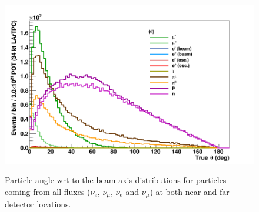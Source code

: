 \begin{figure}[h!]
  \centering
\includegraphics[scale=0.4]{figures/True_Theta_per_Particle}
\label{fig:particle_theta}
  \caption{Particle angle wrt to the beam axis distributions for particles coming from all fluxes ($\nu_e$, $\nu_\mu$, $\bar \nu_e$ and $\bar \nu_\mu$) at both near and far detector locations.  }
\end{figure}

\newpage


